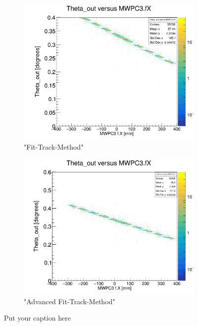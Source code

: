 \documentclass[12pt, letterpaper]{article}
\begin{document}
\begin{figure}[!htbp]
\begin{subfigure}{.5\textwidth}
  \label{fig:sub-second}
\end{subfigure}
\begin{subfigure}{.5\textwidth}
  \centering
  \includegraphics[width=.9\linewidth]{plot_imgs/theta_out_mw3_fit.png} 
  \caption{"Fit-Track-Method"}
  \label{fig:sub-second}
\end{subfigure}
\begin{subfigure}{.5\textwidth}
  \centering
  \includegraphics[width=.9\linewidth]{plot_imgs/theta_out_mw3_last.png} 
  \caption{"Advanced Fit-Track-Method"}
  \label{fig:sub-second}
\end{subfigure}
\caption{Put your caption here}
\label{fig:fig}
\end{figure}
\FloatBarrier
\clearpage
\end{document}
